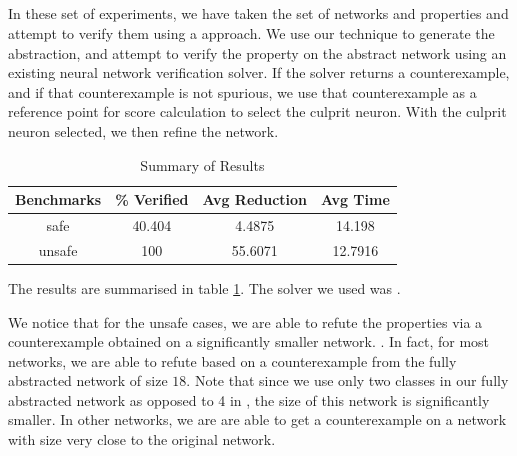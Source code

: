 \subsection{\acasxu}

In these set of experiments, we have taken the \acasxu set of
networks  and
properties and attempt to verify them using a \cegar approach. We use our
technique to generate the abstraction, and attempt to verify the property on the
abstract network using an existing neural network verification solver. If the
solver returns a counterexample, and if that counterexample is not spurious, we
use that counterexample as a reference point for score calculation  to select the culprit neuron.  With the culprit
neuron selected, we then refine the network.

\begin{table}
\begin{tabular}{ |c|c|c|c| }
\hline
Benchmarks &    \% Verified &  Avg Reduction &  Avg Time \\
\hline
safe       &        40.404  &         4.4875 &   14.198  \\
unsafe     &       100      &        55.6071 &   12.7916 \\
\hline
\end{tabular}
\caption{Summary of \acasxu Results}
\label{t:acas-summary}
\end{table}

The results are summarised in table \ref{t:acas-summary}. The solver we used was
\abcrown.  

We notice that for the unsafe cases, we are able to refute the
properties via a counterexample obtained on a significantly smaller network.
.   In fact, for most
networks, we are able to refute based on a counterexample from the fully
abstracted network of size $18$.   Note that since we use only two classes in our
fully abstracted network as opposed to 4 in \cite{cegar-nn}, the size of this
network is significantly smaller. In other networks, we are are able to get a
counterexample on a network with size very close to the original network.

